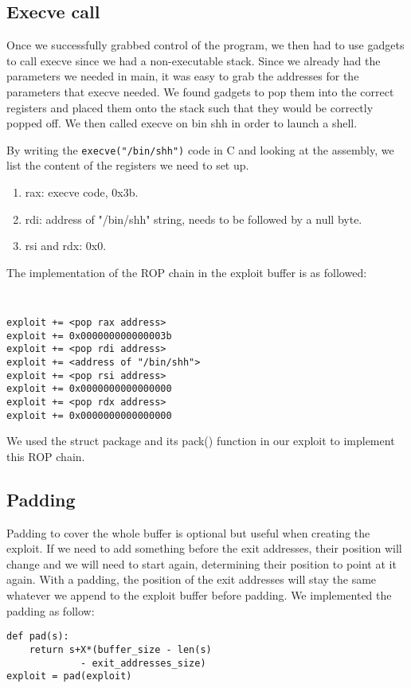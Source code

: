 \subsection{Execve call}
Once we successfully grabbed control of the program, we then had to use gadgets to call execve since we had a non-executable stack. Since we already had the parameters we needed in main, it was easy to grab the addresses for the parameters that execve needed. We found gadgets to pop them into the correct registers and placed them onto the stack such that they would be correctly popped off. We then called execve on bin shh in order to launch a shell.

By writing the {\tt execve("/bin/shh")} code in C and looking at the assembly, we list the content of the registers we need to set up.
\begin{enumerate}
\item rax: execve code, 0x3b.
\item rdi: address of "/bin/shh" string, needs to be followed by a null byte.
\item rsi and rdx: 0x0.
\end{enumerate}
The implementation of the ROP chain in the exploit buffer is as followed:
{\tt \small
\begin{verbatim}
exploit += <pop rax address>
exploit += 0x000000000000003b
exploit += <pop rdi address>
exploit += <address of "/bin/shh">
exploit += <pop rsi address>
exploit += 0x0000000000000000
exploit += <pop rdx address>
exploit += 0x0000000000000000
\end{verbatim}
}
We used the struct package and its pack() function in our exploit to implement this ROP chain.


\subsection{Padding}
Padding to cover the whole buffer is optional but useful when creating the exploit. If we need to add something before the exit addresses, their position will change and we will need to start again, determining their position to point at it again. With a padding, the position of the exit addresses will stay the same whatever we append to the exploit buffer before padding. We implemented the padding as follow:
\begin{verbatim}
def pad(s):
	return s+X*(buffer_size - len(s)
             - exit_addresses_size)
exploit = pad(exploit)
\end{verbatim}

